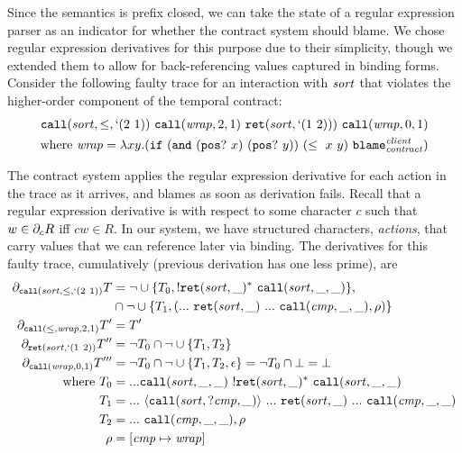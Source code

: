 Since the semantics is prefix closed, we can take the state of a regular expression parser as an indicator for whether the contract system should blame.
%
We chose regular expression derivatives for this purpose due to their simplicity, though we extended them to allow for back-referencing values captured in binding forms.
%
Consider the following faulty trace for an interaction with $\mathit{sort}$ that violates the higher-order component of the temporal contract:
\newcommand*{\wrapv}{\mathit{wrap}}
\begin{align*}
  {\tt call}(\sortid, \le, {\tt `}(2\ 1))~{\tt call}(\wrapv, 2, 1) ~{\tt ret}(\sortid, {\tt `}(1\ 2))) ~{\tt call}(\wrapv, 0, 1) \\
  \text{where } \wrapv  = \lambda x y. ({\tt if}\ ({\tt and}\ ({\tt pos?}\ x)\ ({\tt pos?}\ y))\ (\le\ x\ y)\ \sblame{\mathit{client}}{\mathit{contract}})
\end{align*}

The contract system applies the regular expression derivative for each action in the trace as it arrives, and blames as soon as derivation fails.
%
Recall that a regular expression derivative is with respect to some character $c$ such that $w \in \partial_{c}{R}$ iff $cw \in R$.
%
In our system, we have structured characters, \emph{actions}, that carry values that we can reference later via binding.
%
The derivatives for this faulty trace, cumulatively (previous derivation has one less prime), are
\begin{align*}
  \derive{{\tt call}(\sortid, \le, {\tt `}(2\ 1))}{\mtcon} &= \stnot{\stOr{\setof{\mtcon_0, \stmany{\snonevent{{\tt ret}(\sortid, \_)}} ~{\tt call}(\sortid, \_, \_)}}},
    \\ &\cap \stnot{\stOr{\setof{\mtcon_1, ({\sddd~ {\tt ret}(\sortid, \_)~ \sddd~ {\tt call}(\mathit{cmp}, \_, \_)}, \menv)}}} \\
%
  \derive{{\tt call}(\le, \wrapv, 2, 1)}{\mtcon'} &= \mtcon' \\
%
  \derive{{\tt ret}(\sortid, {\tt `}(1\ 2))}{\mtcon''} &= \stnot{\mtcon_0} \cap \stnot{\stOr{\setof{\mtcon_1, \mtcon_2}}} \\
%
  \derive{{\tt call}(\wrapv, 0, 1)}{\mtcon'''} &= \stnot{\mtcon_0} \cap \stnot{\stOr{\setof{\mtcon_1, \mtcon_2, \epsilon}}} = \stnot{\mtcon_0}\cap \bot = \bot \\
%
  \text{where } \mtcon_0 & = \sddd {\tt call}(\sortid, \_,\_)~ \stmany{\snonevent{{\tt ret}(\sortid, \_)}}~ {\tt call}(\sortid,\_,\_) \\
%
  \mtcon_1 &= \sddd~ \stbind{{\tt call}(\sortid, ?\mathit{cmp}, \_)}{\sddd~ {\tt ret}(\sortid, \_)~ \sddd~ {\tt call}(\mathit{cmp}, \_, \_)} \\
%
  \mtcon_2 &= \sddd~ {\tt call}(\mathit{cmp}, \_, \_), \menv \\
%
  \menv &= [\mathit{cmp} \mapsto \wrapv]
\end{align*}

